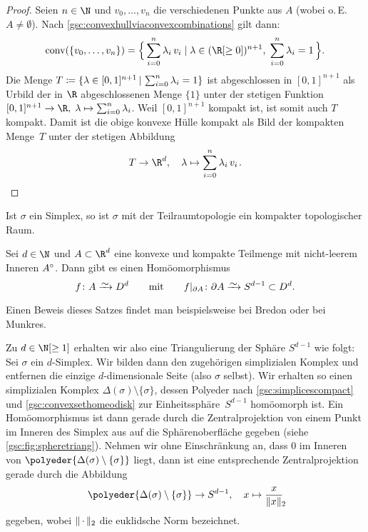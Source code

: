 \begin{proof}
    Seien $n\in\N$ und $v_0,\ldots,v_n$ die verschiedenen Punkte aus $A$
    (wobei o.\,E. $A\neq\emptyset$).
    Nach \cref{gsc:convexhullviaconvexcombinations} gilt dann:
    \[ \conv(\{v_0,\ldots,v_n\}) = 
        \Bigl\{\, \isum^n \lambda_i\,v_i \Mid[\;] \lambda\in(\R[\geq0])^{n+1},
        \; \isum^n \lambda_i = 1    \,\Bigr\}
    . \]
    Die Menge 
    $T\defeq\{ \lambda\in [0,1]^{n+1} \Mid \isum^n \lambda_i = 1 \}$
    ist abgeschlossen in $[0,1]^{n+1}$ als Urbild der in $\R$ abgeschlossenen
    Menge $\{1\}$ unter der stetigen Funktion $[0,1]^{n+1}\to\R,\;
    \lambda\mapsto\isum^n \lambda_i$. Weil $[0,1]^{n+1}$ kompakt ist, ist somit
    auch $T$ kompakt. Damit ist die obige konvexe Hülle kompakt als Bild der
    kompakten Menge~$T$ unter der stetigen Abbildung
    \[ T \to \R^d, \quad \lambda\mapsto \isum^n \lambda_i\,v_i \mkern2mu . \]
\end{proof}

\begin{thKorollar}
    \label{gsc:simplicescompact}
    Ist $\sigma$ ein Simplex, so ist $\sigma$ mit der Teilraumtopologie ein
    kompakter topologischer Raum.
\end{thKorollar}

\begin{thSatz}
    \label{gsc:convexsethomeodisk}
    Sei $d\in\N$ und $A\subset\R^d$ eine konvexe und kompakte Teilmenge mit
    nicht-leerem Inneren $A^\circ$. Dann gibt es einen Homöomorphismus
    \[ f\colon A \isorightarrow D^d \qqtextqq{mit} 
        f\vert_{\setboundary{A}}\colon \setboundary{A} \isorightarrow 
        S^{d-1} \subset D^d 
    . \]
\end{thSatz}

Einen Beweis dieses Satzes findet man beispielsweise bei
Bredon\cite[Ch.\,I,.]{bookc:bredon93} oder bei
Munkres\cite[Ch.\,1,\;\S1,]{bookc:munkres84}.

\begin{thBeispiel}\label{gsc:bsp:spheretriang}
    Zu $d\in\N[\geq1]$ erhalten wir also eine Triangulierung der Sphäre
    $S^{d-1}$ wie folgt: Sei $\sigma$ ein $d$-Simplex. Wir bilden
    dann den zugehörigen simplizialen Komplex und entfernen die einzige
    $d$-dimensionale Seite (also $\sigma$ selbst). Wir erhalten so einen
    simplizialen Komplex $\Delta(\sigma)\setminus\{\sigma\}$, dessen Polyeder
    nach \cref{gsc:simplicescompact} und \cref{gsc:convexsethomeodisk} zur
    Einheitssphäre~$S^{d-1}$ homöomorph ist. Ein Homöomorphismus ist dann
    gerade durch die Zentralprojektion von einem Punkt im Inneren des Simplex
    aus auf die Sphärenoberfläche gegeben (siehe \cref{gsc:fig:spheretriang}).
    Nehmen wir ohne Einschränkung an, dass $0$ im Inneren von
    $\polyeder{\Delta(\sigma)\setminus\{\sigma\}}$ liegt, dann ist eine
    entsprechende Zentralprojektion gerade durch die Abbildung
    \[ \polyeder{\Delta(\sigma)\setminus\{\sigma\}} \to S^{d-1},\quad
        x\mapsto \frac{x}{\norm{x}_{\mathrlap{2}}}
    \]
    gegeben, wobei $\lVert\,\cdot\,\rVert_2$ die euklidsche Norm bezeichnet.
\end{thBeispiel}

